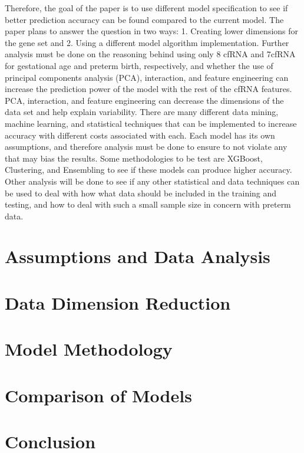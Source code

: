 \documentclass[]{llncs}
\begin{document}
Therefore, the goal of the paper is to use different model specification to see if better prediction accuracy can be found compared to the current model. The paper plans to answer the question in two ways: 1. Creating lower dimensions for the gene set and 2. Using a different model algorithm implementation. Further analysis must be done on the reasoning behind using only 8 cfRNA and 7cfRNA for gestational age and preterm birth, respectively, and whether the use of principal components analysis (PCA), interaction, and feature engineering can increase the prediction power of the model with the rest of the cfRNA features. PCA, interaction, and feature engineering can decrease the dimensions of the data set and help explain variability.  There are many different data mining, machine learning, and statistical techniques that can be implemented to increase accuracy with different costs associated with each. Each model has its own assumptions, and therefore analysis must be done to ensure to not violate any that may bias the results. Some methodologies to be test are XGBoost, Clustering, and Ensembling to see if these models can produce higher accuracy. Other analysis will be done to see if any other statistical and data techniques can be used to deal with how what data should be included in the training and testing, and how to deal with such a small sample size in concern with preterm data.    

\section{Assumptions and  Data Analysis}

\section{Data Dimension Reduction}

\section{Model Methodology}

\section{Comparison of Models}

\section{Conclusion}
\end{document}
